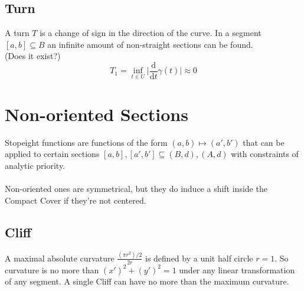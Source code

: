 \documentclass{report}
\begin{document}
\subsection{Turn}
A turn $T$ is a change of sign in the direction of the curve. In a segment $[a,b] \subseteq B$ an infinite amount of non-straight sections can be found.\\
(Does it exist?)
\begin{equation}
T_{1} = \inf_{t \in U} \lvert \frac{\mathrm{d}}{\mathrm{d}t}\gamma(t) \rvert \approx 0
\end{equation}

\section{Non-oriented Sections}
Stopeight functions are functions of the form $(a,b) \mapsto (a',b')$ that can be applied to certain sections $[a,b],[a',b'] \subseteq (B,d),(A,d)$ with constraints of analytic priority.\\\\
Non-oriented ones are symmetrical, but they do induce a shift inside the Compact Cover if they're not centered.

\subsection{Cliff}
A maximal absolute curvature $\frac{(\pi r^2) /2}{2r}$ is defined by a unit half circle $r=1$. So curvature is no more than $(x')^2 + (y')^2 =1$  under any linear transformation of any segment.
A single Cliff can have no more than the maximum curvature.
\end{document}
